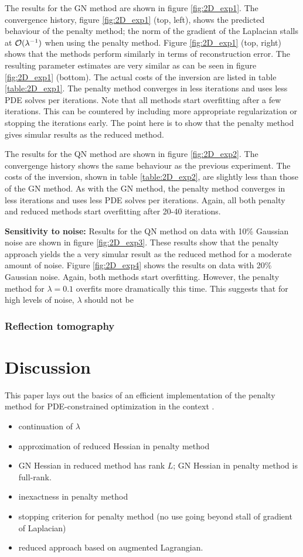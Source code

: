 \documentclass{iopart}
\begin{document}
The results for the GN method are shown in figure \ref{fig:2D_exp1}.
The convergence history, figure \ref{fig:2D_exp1} (top, left), shows the predicted behaviour 
of the penalty method; the norm of the gradient of the Laplacian stalls at $\mathcal{O}(\lambda^{-1})$ when using the penalty method. 
Figure \ref{fig:2D_exp1} (top, right) shows that the methods perform similarly in terms of reconstruction error. 
The resulting parameter estimates are very similar as can be seen 
in figure \ref{fig:2D_exp1} (bottom). The actual costs of the inversion are listed in table \ref{table:2D_exp1}.
The penalty method converges in less iterations and uses less PDE solves per iterations.
Note that all methods start overfitting after a few iterations. This can be countered by including more appropriate regularization or stopping the iterations early.
The point here is to show that the penalty method gives simular results as the reduced method.

The results for the QN method are shown in figure \ref{fig:2D_exp2}. The convergenge history shows the same behaviour as 
the previous experiment. The costs of the inversion, shown in table \ref{table:2D_exp2}, are slightly less than 
those of the GN method. As with the GN method, the penalty method converges in less iterations and uses less PDE solves per iterations.
Again, all both penalty and reduced methods start overfitting after 20-40 iterations.

\textbf{Sensitivity to noise:}
Results for the QN method on data with 10\% Gaussian noise are shown in figure  \ref{fig:2D_exp3}. These results show that the penalty approach yields the a very simular
result as the reduced method for a moderate amount of noise. Figure \ref{fig:2D_exp4} shows the results on data with 20\% Gaussian noise. Again, both methods start overfitting. However, the penalty method for $\lambda=0.1$
overfits more dramatically this time. This suggests that for high levels of noise, $\lambda$ should not be 


\subsubsection{Reflection tomography}


\section{Discussion}
\label{discussion}
This paper lays out the basics of an efficient implementation of the
penalty method for PDE-constrained optimization in the context . 
\begin{itemize}
\item continuation of $\lambda$
\item approximation of reduced Hessian in penalty method
\item GN Hessian in reduced method has rank $L$; GN Hessian in penalty method is full-rank.
\item inexactness in penalty method
\item stopping criterion for penalty method (no use going beyond stall of gradient of Laplacian)
\item reduced approach based on augmented Lagrangian.
\end{itemize}
\end{document}
